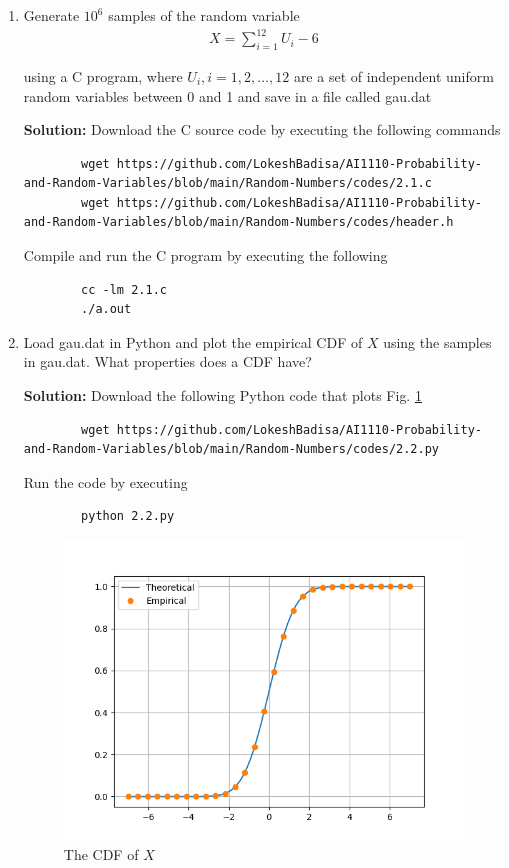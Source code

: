 \documentclass[journal,12pt,twocolumn]{IEEEtran}
\newcommand{\solution}{\noindent \textbf{Solution: }}
\numberwithin{equation}{section}
\renewcommand\thesection{\arabic{section}}
\begin{document}
	\begin{enumerate}[label=\thesection.\arabic*,ref=\thesection.\theenumi]
	\item Generate $10^6$ samples of the random variable
	\begin{align}
		X = \sum_{i=1}^{12}U_i -6
	\end{align}

	using a C program, where $U_i, i = 1,2,\dots, 12$ are  a set of independent uniform random variables between 0 and 1 and save in a file called gau.dat
	
	\solution Download the C source code by executing the following commands
	\begin{lstlisting}
		wget https://github.com/LokeshBadisa/AI1110-Probability-and-Random-Variables/blob/main/Random-Numbers/codes/2.1.c
		wget https://github.com/LokeshBadisa/AI1110-Probability-and-Random-Variables/blob/main/Random-Numbers/codes/header.h
	\end{lstlisting}
	Compile and run the C program by executing the following
	\begin{lstlisting}
		cc -lm 2.1.c
		./a.out
	\end{lstlisting}
		
	\item Load gau.dat in Python and plot the empirical CDF of $X$ using the samples in gau.dat. What properties does a CDF have?

	\solution Download the following Python code that plots Fig. \ref{fig-2.2}
	\begin{lstlisting}
		wget https://github.com/LokeshBadisa/AI1110-Probability-and-Random-Variables/blob/main/Random-Numbers/codes/2.2.py
	\end{lstlisting}
	Run the code by executing
	\begin{lstlisting}
		python 2.2.py
	\end{lstlisting}
	\begin{figure}
		\centering
		\includegraphics[width=\columnwidth]{./figs/2.2.png}
		\caption{The CDF of $X$}
		\label{fig-2.2}
	\end{figure}
	

\end{enumerate}
\end{document}
